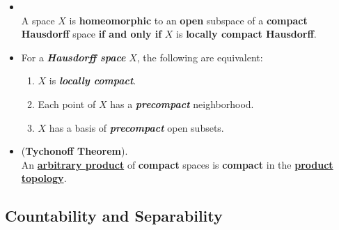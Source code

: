 \documentclass[11pt]{article}
\begin{document}
\begin{itemize}
\item \begin{corollary}  \citep{munkres2000topology} \\
A space $X$ is \textbf{homeomorphic} to an \textbf{open} subspace of a \textbf{compact Hausdorff} space \textbf{if and only if} $X$ is \textbf{locally compact Hausdorff}.
\end{corollary}

\item For a \emph{\textbf{Hausdorff space}} $X$,  the following are equivalent:
\begin{enumerate}
\item $X$ is \emph{\textbf{locally compact}}.
\item Each point of $X$ has a \emph{\textbf{precompact}} neighborhood. 
\item $X$ has a basis of \emph{\textbf{precompact}} open subsets.
\end{enumerate}

\item \begin{theorem} (\textbf{Tychonoff Theorem}). \citep{munkres2000topology} \\
 An \underline{\textbf{arbitrary product}} of \textbf{compact} spaces is \textbf{compact} in the \underline{\textbf{product topology}}.
\end{theorem}
\end{itemize}
\subsection{Countability and Separability}
\end{document}
